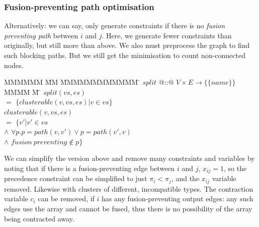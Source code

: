 \subsubsection{Fusion-preventing path optimisation}
\label{s:OptimisedConstraints}
Alternatively:
we can say, only generate constraints if there is no \emph{fusion preventing path} between $i$ and $j$.
Here, we generate fewer constraints than originally, but still more than above.
We also must preprocess the graph to find such blocking paths.
But we still get the minimisation to count non-connected nodes.

\begin{tabbing}
MMMMMM      \= MM   \=  MMMMMMMMMMMM    \=  \kill
$split$     \> @::@ \> $V \times E \to \{ \{name\} \}$      \\
MMMM        \= M    \= \kill
$split(vs,es)$ \\
    \> $=$  \> $\{clusterable(v,vs,es) | v \in vs\}$      \\
$clusterable(v,vs,es)$  \\
    \>$=$       \>$\{v' | v' \in vs$                                \\
    \>$\wedge$  \>$\forall p. p = path(v,v') \vee p = path(v',v)$   \\
    \>$\wedge$  \>$fusion~preventing \not\in p\}$\\
\end{tabbing}


We can simplify the version above and remove many constraints and variables by noting that if there is a fusion-preventing edge between $i$ and $j$, $x_{ij} = 1$, so the precedence constraint can be simplified to just $\pi_i < \pi_j$, and the $x_{ij}$ variable removed.
Likewise with clusters of different, incompatible types.
The contraction variable $c_i$ can be removed, if $i$ has any fusion-preventing output edges: any such edges use the array and cannot be fused, thus there is no possibility of the array being contracted away.

